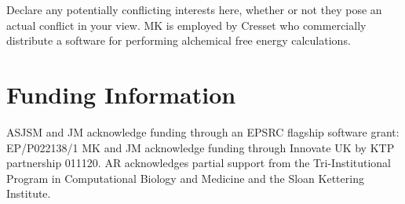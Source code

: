 \documentclass[9pt,bestpractices]{livecoms}
\begin{document}
Declare any potentially conflicting interests here, whether or not they pose an actual conflict in your view.
MK is employed by Cresset who commercially distribute a software for performing alchemical free energy calculations.

\section*{Funding Information}
ASJSM and JM acknowledge funding through an EPSRC flagship software grant: EP/P022138/1
MK and JM acknowledge funding through Innovate UK by KTP partnership 011120.
AR acknowledges partial support from the Tri-Institutional Program in Computational Biology and Medicine and the Sloan Kettering Institute.




\end{document}
